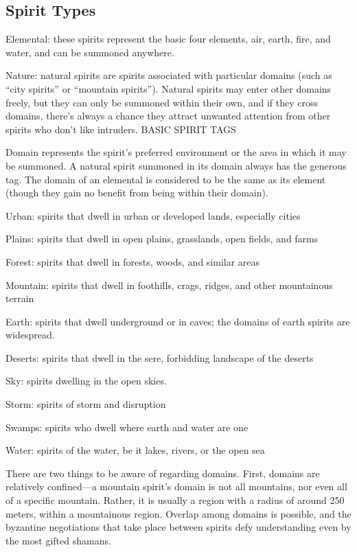 \subsection{Spirit Types}
Elemental: these spirits represent the basic four elements, air, earth, fire, and water, and can be summoned anywhere.

Nature: natural spirits are spirits associated with particular domains (such as “city spirits” or “mountain spirits”). Natural spirits may enter other domains freely, but they can only be summoned within their own, and if they cross domains, there’s always a chance they attract unwanted attention from other spirits who don’t like intruders.
BASIC SPIRIT TAGS

Domain represents the spirit’s preferred environment or the area in which it may be summoned. A natural spirit summoned in its domain always has the generous tag. The domain of an elemental is considered to be the same as its element (though they gain no benefit from being within their domain).

Urban: spirits that dwell in urban or developed lands, especially cities

Plains: spirits that dwell in open plains, grasslands, open fields, and farms

Forest: spirits that dwell in forests, woods, and similar areas

Mountain: spirits that dwell in foothills, crags, ridges, and other mountainous terrain

Earth: spirits that dwell underground or in caves; the domains of earth spirits are widespread.

Deserts: spirits that dwell in the sere, forbidding landscape of the deserts

Sky: spirits dwelling in the open skies.

Storm: spirits of storm and disruption

Swamps: spirits who dwell where earth and water are one

Water: spirits of the water, be it lakes, rivers, or the open sea

There are two things to be aware of regarding domains. First, domains are relatively confined—a mountain spirit’s domain is not all mountains, nor even all of a specific mountain. Rather, it is usually a region with a radius of around 250 meters, within a mountainous region. Overlap among domains is possible, and the byzantine negotiations that take place between spirits defy understanding even by the most gifted shamans.

